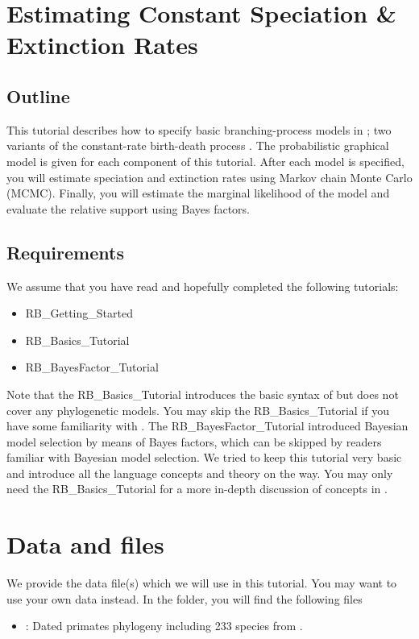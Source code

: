 \section{Estimating Constant Speciation \& Extinction Rates}

\subsection{Outline}

This tutorial describes how to specify basic branching-process models in \RevBayes;
two variants of the constant-rate birth-death process \citep{Yule1925,Kendall1948,Thompson1975,Nee1994b,Rannala1996,Yang1997,Hoehna2015a}.
The probabilistic graphical model is given for each component of this tutorial.
After each model is specified, you will estimate speciation and extinction rates using Markov chain Monte Carlo (MCMC).
Finally, you will estimate the marginal likelihood of the model and evaluate the relative support using Bayes factors.

\subsection{Requirements}
We assume that you have read and hopefully completed the following tutorials:
\begin{itemize}
\item RB\_Getting\_Started
\item RB\_Basics\_Tutorial
\item RB\_BayesFactor\_Tutorial
\end{itemize}
Note that the RB\_Basics\_Tutorial introduces the basic syntax of \Rev but does not cover any phylogenetic models.
You may skip the RB\_Basics\_Tutorial if you have some familiarity with \R.
The RB\_BayesFactor\_Tutorial introduced Bayesian model selection by means of Bayes factors, which can be skipped by readers familiar with Bayesian model selection.
We tried to keep this tutorial very basic and introduce all the language concepts and theory on the way.
You may only need the RB\_Basics\_Tutorial for a more in-depth discussion of concepts in \Rev.


\section{Data and files}

We provide the data file(s) which we will use in this tutorial.
You may want to use your own data instead.
In the  folder, you will find the following files
\begin{itemize}
\item {}: Dated primates phylogeny including 233 species from \cite{MagnusonFord2012}.
\end{itemize}


